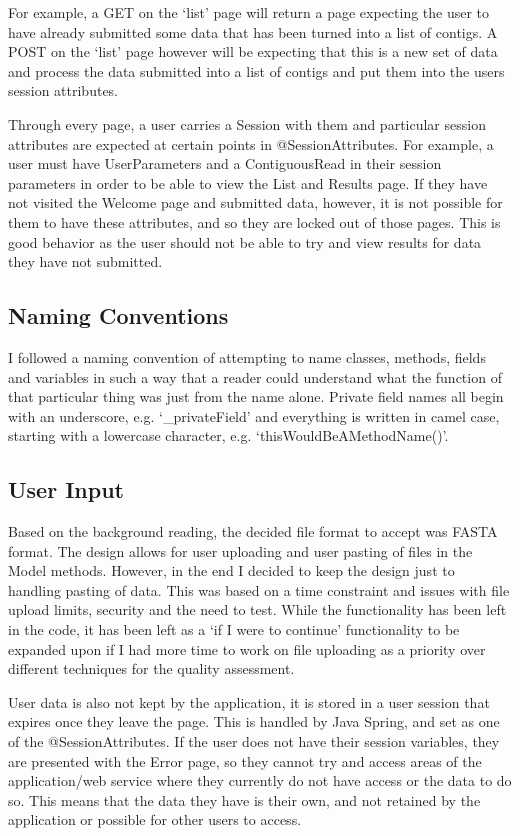 For example, a GET on the `list' page will return a page expecting the user to have already submitted some data that has been turned into a list of contigs. A POST on the `list' page however will be expecting that this is a new set of data and process the data submitted into a list of contigs and put them into the users session attributes.

Through every page, a user carries a Session with them and particular session attributes are expected at certain points in @SessionAttributes. For example, a user must have UserParameters and a ContiguousRead in their session parameters in order to be able to view the List and Results page. If they have not visited the Welcome page and submitted data, however, it is not possible for them to have these attributes, and so they are locked out of those pages. This is good behavior as the user should not be able to try and view results for data they have not submitted.

\subsection{Naming Conventions}
I followed a naming convention of attempting to name classes, methods, fields and variables in such a way that a reader could understand what the function of that particular thing was just from the name alone. Private field names all begin with an underscore, e.g. `\_privateField' and everything is written in camel case, starting with a lowercase character, e.g. `thisWouldBeAMethodName()'.

\subsection{User Input}
Based on the background reading, the decided file format to accept was FASTA format. The design allows for user uploading and user pasting of files in the Model methods. However, in the end I decided to keep the design just to handling pasting of data. This was based on a time constraint and issues with file upload limits, security and the need to test. While the functionality has been left in the code, it has been left as a `if I were to continue' functionality to be expanded upon if I had more time to work on file uploading as a priority over different techniques for the quality assessment.

User data is also not kept by the application, it is stored in a user session that expires once they leave the page. This is handled by Java Spring, and set as one of the @SessionAttributes. If the user does not have their session variables, they are presented with the Error page, so they cannot try and access areas of the application/web service where they currently do not have access or the data to do so. This means that the data they have is their own, and not retained by the application or possible for other users to access.

